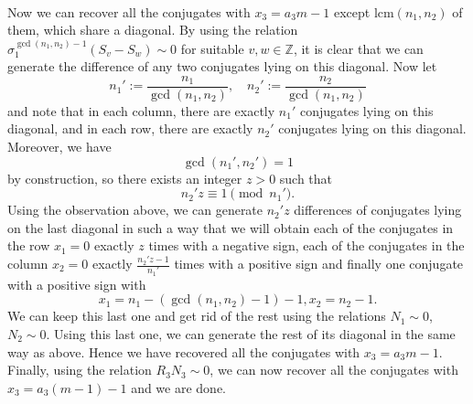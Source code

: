 \documentclass[12pt,a4paper]{article}
\newcommand{\Z}{\mathbb{Z}}
\newcommand{\lcm}{\mathrm{lcm}}
\begin{document}
\paragraph*{}
Now we can recover all the conjugates with $x_3=a_3m-1$ except $\lcm(n_1,n_2)$ of them, which share a diagonal. By using the relation $\sigma_1^{\gcd\left(n_1,n_2\right)-1}\left(S_v-S_w\right)\sim 0$ for suitable $v,w\in\Z$, it is clear that we can generate the difference of any two conjugates lying on this diagonal. Now let $$n_1':=\frac{n_1}{\gcd\left(n_1,n_2\right)}, \quad n_2':=\frac{n_2}{\gcd\left(n_1,n_2\right)}$$ and
note that in each column, there are exactly $n_1'$ conjugates lying on this diagonal, and in each row, there are exactly $n_2'$ conjugates lying on this diagonal. Moreover, we have $$\gcd\left(n_1',n_2'\right)=1$$ by construction,
so there exists an integer $z>0$ such that $$n_2'z\equiv 1\pmod{n_1'}.$$
Using the observation above, we can generate $n_2'z$ differences of conjugates lying on the last diagonal in such a way that we will obtain each of the conjugates in the row $x_1=0$ exactly $z$ times with a negative sign, each of the conjugates in the column $x_2=0$ exactly $\frac{n_2'z-1}{n_1'}$ times with a positive sign and finally one conjugate with a positive sign with $$x_1=n_1-(\gcd\left(n_1,n_2\right)-1)-1,x_2=n_2-1.$$
We can keep this last one and get rid of the rest using the relations $N_1\sim 0$, $N_2\sim 0$. Using this last one, we can generate the rest of its diagonal in the same way as above. Hence we have recovered all the conjugates with $x_3=a_3m-1$. Finally, using the relation $R_3N_3\sim 0$, we can now recover all the conjugates with $x_3=a_3(m-1)-1$ and we are done.

\end{document}
